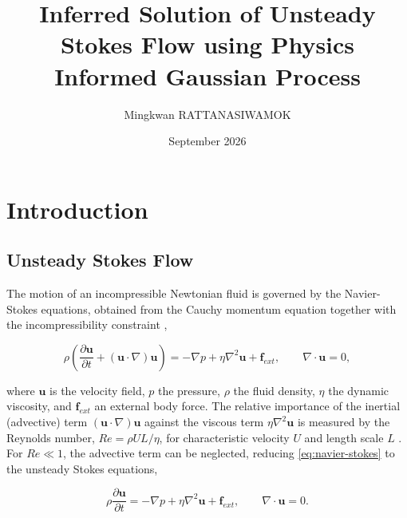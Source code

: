 \documentclass[11pt, a4paper]{report}
\title{Inferred Solution of Unsteady Stokes Flow using Physics Informed Gaussian Process}
\author{Mingkwan RATTANASIWAMOK}
\date{September 2026}
\begin{document}
\maketitle


\pagebreak  %

\chapter{Introduction}
    \section{Unsteady Stokes Flow}
The motion of an incompressible Newtonian fluid is governed by the Navier-Stokes
equations, obtained from the Cauchy momentum equation together with the
incompressibility constraint \parencite{BirdStewartLightfoot2002},

\vspace{0.5cm}
\begin{equation}
    \rho\left(\frac{\partial \boldsymbol{u}}{\partial t} + (\boldsymbol{u}\cdot\nabla)\boldsymbol{u}\right)
    = -\nabla p + \eta{\nabla}^{2} \boldsymbol{u} + \boldsymbol{f}_{ext},
    \qquad
    \nabla\cdot\boldsymbol{u} = 0,
    \label{eq:navier-stokes}
\end{equation}

\vspace{0.5cm}
\noindent where \(\boldsymbol{u}\) is the velocity field, \(p\) the pressure, \(\rho\) the fluid
density, \(\eta\) the dynamic viscosity, and \(\boldsymbol{f}_{ext}\) an external body force.
The relative importance of the inertial (advective) term \((\boldsymbol{u}\cdot\nabla)\boldsymbol{u}\)
against the viscous term \(\eta\nabla^2\boldsymbol{u}\) is measured by the Reynolds number,
\(Re = \rho U L / \eta\), for characteristic velocity \(U\) and length scale \(L\)
\parencite{BirdStewartLightfoot2002}. For \(Re \ll 1\), the advective term can be
neglected, reducing \eqref{eq:navier-stokes} to the unsteady Stokes equations,

\vspace{0.5cm}
\begin{equation}
    \rho \frac{\partial \boldsymbol{u}}{\partial t} = -\nabla p + { \eta\nabla}^{2} \boldsymbol{u} + \boldsymbol{f}_{ext},
    \qquad
    \nabla\cdot\boldsymbol{u} = 0.
    \label{eq:unsteady}
\end{equation}

\vspace{0.5cm}
\end{document}

